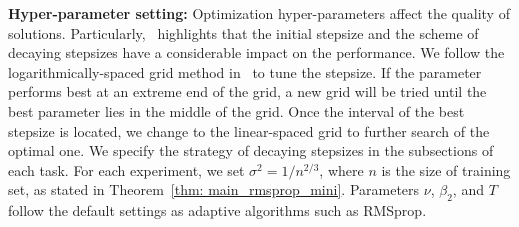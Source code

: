 \documentclass[11pt]{article}
\begin{document}
\textbf{Hyper-parameter setting:} 
Optimization hyper-parameters affect the quality of solutions. 
Particularly,~\citet{wiro17} highlights that the initial stepsize and the scheme of decaying stepsizes have a considerable impact on the performance. 
We follow the logarithmically-spaced grid method in~\citet{wiro17} to tune the stepsize. 
If the parameter performs best at an extreme end of the grid, a new grid will be tried until the best parameter lies in the middle of the grid. 
Once the interval of the best stepsize is located, we change to the linear-spaced grid to further search of the optimal one. 
We specify the strategy of decaying stepsizes in the subsections of each task. 
For each experiment, we set $\sigma^2 = 1/n^{2/3}$, where $n$ is the size of training set, as stated in Theorem~\ref{thm: main_rmsprop_mini}. 
Parameters $\nu$, $\beta_2$, and $T$ follow the default settings as adaptive algorithms such as RMSprop. 

\vspace{-0.05in}
\end{document}
